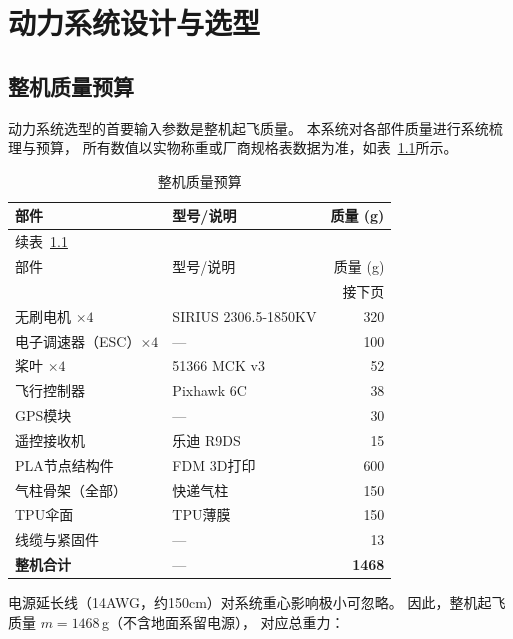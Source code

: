 
\chapter{动力系统设计与选型}

\section{整机质量预算}

动力系统选型的首要输入参数是整机起飞质量。
本系统对各部件质量进行系统梳理与预算，
所有数值以实物称重或厂商规格表数据为准，如表~\ref{tab:mass_budget}所示。

\begin{longtable}{llr}
    \caption{整机质量预算}
    \label{tab:mass_budget} \\

    \toprule
    部件 & 型号/说明 & 质量 (g) \\
    \midrule
    \endfirsthead

    \multicolumn{3}{l}{\small 续表~\ref*{tab:mass_budget}} \\[2pt]
    \toprule
    部件 & 型号/说明 & 质量 (g) \\
    \midrule
    \endhead

    \midrule
    \multicolumn{3}{r}{\small 接下页} \\
    \endfoot

    \bottomrule
    \endlastfoot

    无刷电机 $\times 4$          & SIRIUS 2306.5-1850KV & 320 \\[3pt]
    电子调速器（ESC）$\times 4$  & —                    & 100 \\[3pt]
    桨叶 $\times 4$              & 51366 MCK v3         &  52 \\[3pt]
    飞行控制器                   & Pixhawk 6C           &  38 \\[3pt]
    GPS模块                      & —                    &  30 \\[3pt]
    遥控接收机                   & 乐迪 R9DS            &  15 \\[3pt]
    PLA节点结构件                & FDM 3D打印           & 600 \\[3pt]
    气柱骨架（全部）             & 快递气柱             & 150 \\[3pt]
    TPU伞面                      & TPU薄膜              & 150 \\[3pt]
    线缆与紧固件                 & —                    &  13 \\
    \midrule
    \textbf{整机合计}            & —                    & \textbf{1468} \\

\end{longtable}
电源延长线（14AWG，约150cm）对系统重心影响极小可忽略。
因此，整机起飞质量 $m = 1468$\,g（不含地面系留电源），
对应总重力：

